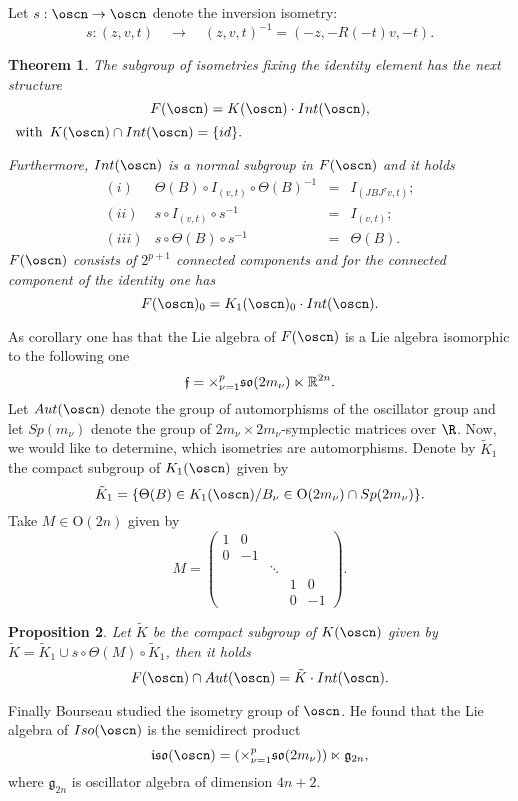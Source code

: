 \documentclass[12pt]{amsart}
\theoremstyle{plain}
\newtheorem{thm}{Theorem}[section]
\newtheorem{prop}[thm]{Proposition}
\theoremstyle{definition}
\theoremstyle{remark}
\begin{document}
Let $s:\oscn \to \oscn$ denote the inversion  isometry:
$$s: (z,v,t) \quad \to \quad (z,v,t)^{-1}=(-z, -R(-t)v,-t).$$

    \begin{thm}\cite{Bou} \label{Bou}
        The subgroup of isometries fixing the identity element has the next structure
        $$F(\oscn)=K(\oscn)\cdot 
       Int(\oscn),$$
       $ \, \mbox{ with  }\, K(\oscn)\cap Int(\oscn)=\{id\}.$
        
        Furthermore, $Int(\oscn)$ is a normal subgroup in $F(\oscn)$ and it holds
    $$ \begin{array}{crcl}
        	(i) & \Theta(B)\circ I_{(v,t)}\circ \Theta(B)^{-1} & = &I_{(JBJ^{\tau}v,t)};\\  	
        
        	(ii) & s\circ I_{(v,t)}\circ s^{-1} & = & I_{(v,t)};\\
        
        (iii) & s \circ \Theta(B) \circ s^{-1} &   = & \Theta(B).
        \end{array}$$
  $F(\oscn)$ consists of $2^{p+1}$ connected components and for the connected component of the identity one has
  $$F(\oscn)_0=K_1(\oscn)_0\cdot Int(\oscn).$$
        \end{thm}

   
As corollary one has that the Lie algebra of $F(\oscn)$ is a Lie algebra isomorphic to the following one
$$\mathfrak f ={\Large \times}_{\nu=1}^p \mathfrak{so}(2m_{\nu}) \ltimes \mathbb R^{2n}.$$
    Let $Aut(\oscn)$ denote the group of automorphisms of the oscillator group and let $Sp(m_{\nu})$ denote the group of $2m_{\nu}\times 2m_{\nu}$-symplectic matrices over $\R$. Now, we would like to determine, which isometries are automorphisms. Denote by $\tilde{K}_1$ the compact subgroup of $K_1(\oscn)$ given by 
     $$\tilde{K}_1=\{\Theta(B)\in K_1(\oscn)/B_{\nu}\in \mathrm{O}(2m_{\nu})\cap Sp(2m_{\nu})\}.$$
	Take $M\in \mathrm{O}(2n)$ given by
	$$M=\left( \begin{matrix}
	1 & 0 & & &\\
	0 & -1 & & &\\
	& & \ddots & &\\
	& & & 1 & 0\\
	& & & 0 & -1
	\end{matrix}
	\right).
	$$
	\begin{prop}
		Let $\tilde{K}$ be the compact subgroup of $K(\oscn)$ given by
	$\tilde{K}=\tilde{K}_1 \cup s\circ \Theta(M) \circ \tilde{K}_1$, then it holds
	$$F(\oscn)\cap Aut(\oscn)=\tilde{K}\cdot Int(\oscn).$$
	\end{prop}
Finally Bourseau studied the isometry group of $\oscn$. He found that
the Lie algebra of $Iso(\oscn)$ is the semidirect product
$$\mathfrak{iso}(\oscn)=(\times_{\nu=1}^p \mathfrak{so}(2m_{\nu}))\ltimes \mathfrak g_{2n},$$
where $\mathfrak{g}_{2n}$ is oscillator algebra of dimension $4n+2$. 
\end{document}
